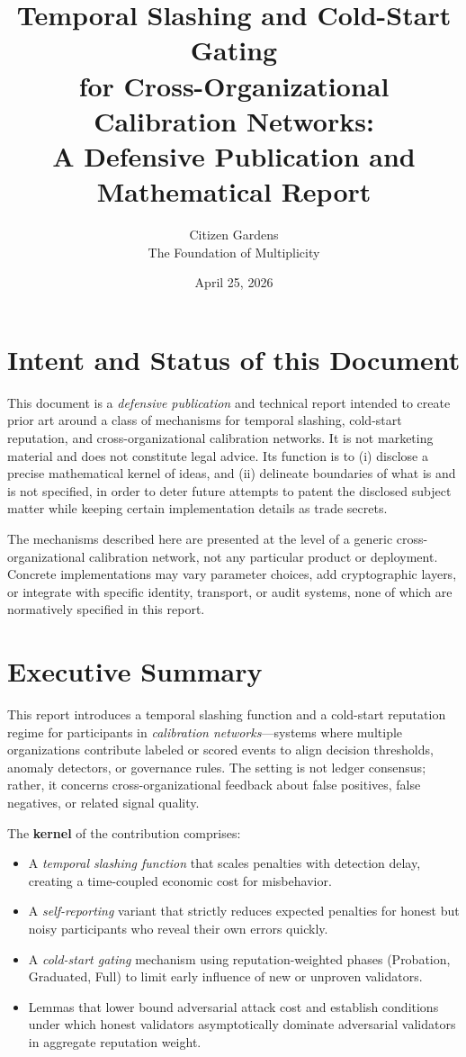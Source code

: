 \documentclass[11pt]{article}
\title{Temporal Slashing and Cold-Start Gating \\ for Cross-Organizational Calibration Networks:\\
A Defensive Publication and Mathematical Report}
\author{Citizen Gardens \\ The Foundation of Multiplicity}
\date{April 25, 2026}
\theoremstyle{plain}
\theoremstyle{definition}
\begin{document}
\maketitle

\section*{Intent and Status of this Document}

This document is a \emph{defensive publication} and technical report intended to create prior art around a class of mechanisms for temporal slashing, cold-start reputation, and cross-organizational calibration networks. It is not marketing material and does not constitute legal advice. Its function is to (i) disclose a precise mathematical kernel of ideas, and (ii) delineate boundaries of what is and is not specified, in order to deter future attempts to patent the disclosed subject matter while keeping certain implementation details as trade secrets.

The mechanisms described here are presented at the level of a generic cross-organizational calibration network, not any particular product or deployment. Concrete implementations may vary parameter choices, add cryptographic layers, or integrate with specific identity, transport, or audit systems, none of which are normatively specified in this report.

\newpage
\tableofcontents


\section{Executive Summary}

This report introduces a temporal slashing function and a cold-start reputation regime for participants in \emph{calibration networks}---systems where multiple organizations contribute labeled or scored events to align decision thresholds, anomaly detectors, or governance rules. The setting is not ledger consensus; rather, it concerns cross-organizational feedback about false positives, false negatives, or related signal quality.

The \textbf{kernel} of the contribution comprises:
\begin{itemize}[leftmargin=*]
  \item A \emph{temporal slashing function} that scales penalties with detection delay, creating a time-coupled economic cost for misbehavior.
  \item A \emph{self-reporting} variant that strictly reduces expected penalties for honest but noisy participants who reveal their own errors quickly.
  \item A \emph{cold-start gating} mechanism using reputation-weighted phases (Probation, Graduated, Full) to limit early influence of new or unproven validators.
  \item Lemmas that lower bound adversarial attack cost and establish conditions under which honest validators asymptotically dominate adversarial validators in aggregate reputation weight.
\end{itemize}
\end{document}
